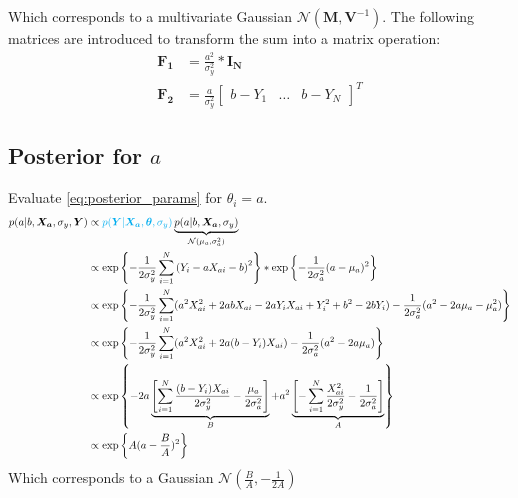 \documentclass[10pt]{article}
\renewcommand{\vec}[1]{\boldsymbol{#1}}
\newcommand{\mat}[1]{\boldsymbol{#1}}
\begin{document}
Which corresponds to a multivariate Gaussian $\mathcal{N}(\vec{M}, \mat{V}^{-1})$. 
The following matrices are introduced to transform the sum into a matrix operation:
\begin{align}
    \mat{F_1} &= \frac{a^2}{\sigma_y^2} * \mat{I_N} \\
    \vec{F_2} &= \frac{a}{\sigma_y^2} \begin{bmatrix} b-Y_1 & \dots & b-Y_N \end{bmatrix}^T
\end{align}

\subsection{Posterior for $a$}
Evaluate \cref{eq:posterior_params} for $\theta_i= a$.
\begin{align}
    p(a|b, \vec{X_a}, \sigma_y, \vec{Y}) &\propto {\color{cyan} p(\vec{Y} | \vec{X_a}, \vec{\theta}, \sigma_y)} \underbrace{p(a | b, \vec{X_a}, \sigma_{y})}_{\mathcal{N}(\mu_a, \sigma_a^2)} \\
    &\propto \exp\left\{ - \frac{1}{2\sigma_y^2} \sum_{i=1}^N \left( Y_i - a X_{ai} - b \right)^2 \right\} * \exp\left\{ - \frac{1}{2\sigma_a^2} ( a - \mu_a )^2 \right\} \\
    &\propto \exp\left\{ - \frac{1}{2\sigma_y^2} \sum_{i=1}^N (a^2 X_{ai}^2  + 2 a b X_{ai} - 2 a Y_i X_{ai} + Y_i^2 + b^2 -2 b Y_i) - \frac{1}{2\sigma_a^2} ( a^2 - 2 a \mu_a - \mu_a^2 ) \right\} \\
    &\propto \exp\left\{ - \frac{1}{2\sigma_y^2} \sum_{i=1}^N (a^2 X_{ai}^2  + 2 a (b - Y_i) X_{ai} ) - \frac{1}{2\sigma_a^2} ( a^2 - 2 a \mu_a ) \right\} \\
    &\propto \exp\left\{ - 2 a \underbrace{\left[ \sum_{i=1}^N \frac{(b - Y_i) X_{ai}}{2\sigma_y^2} - \frac{\mu_a}{2\sigma_a^2} \right]}_{B} + a^2 \underbrace{\left[ - \sum_{i=1}^N \frac{X_{ai}^2}{2\sigma_y^2}  - \frac{1}{2\sigma_a^2} \right]}_{A} \right\} \\
    &\propto \exp\left\{ A (a - \frac{B}{A})^2\right\}
\end{align}
Which corresponds to a Gaussian $\mathcal{N}(\frac{B}{A}, -\frac{1}{2A})$
\end{document}
